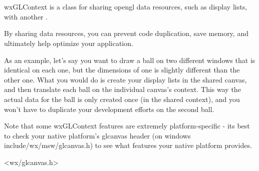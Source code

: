 \section{}\label{wxglcontext}

wxGLContext is a class for sharing opengl data resources, such as display lists, with another .

By sharing data resources, you can prevent code duplication, save memory, and ultimately help optimize your application.

As an example, let's say you want to draw a ball on two different windows that is identical on each one, but the dimensions of one is slightly different than the other one.  What you would do is create your display lists in the shared canvas, and then translate each ball on the individual canvas's context.  This way the actual data for the ball is only created once (in the shared context), and you won't have to duplicate your development efforts on the second ball.

Note that some wxGLContext features are extremely platform-specific - its best to check your native platform's glcanvas header (on windows include/wx/msw/glcanvas.h) to see what features your native platform provides.




<wx/glcanvas.h>\\
\\ 



\label{wxglcontextconstr}





\label{wxglcontextgetwindow}

